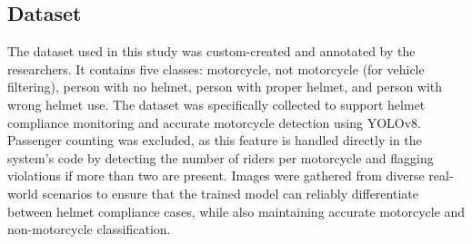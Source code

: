 \begin{refsection}
\subsection*{Dataset}

The dataset used in this study was custom-created and annotated by the researchers. It contains five classes: motorcycle, not motorcycle (for vehicle filtering), person with no helmet, person with proper helmet, and person with wrong helmet use. The dataset was specifically collected to support helmet compliance monitoring and accurate motorcycle detection using YOLOv8. Passenger counting was excluded, as this feature is handled directly in the system’s code by detecting the number of riders per motorcycle and flagging violations if more than two are present. Images were gathered from diverse real-world scenarios to ensure that the trained model can reliably differentiate between helmet compliance cases, while also maintaining accurate motorcycle and non-motorcycle classification.

\begin{figure}[H]
    \centering


\end{figure}
\end{refsection}
